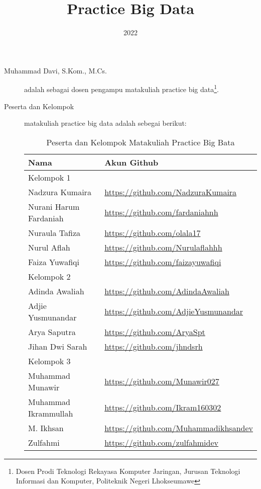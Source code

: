 \documentclass[a4paper]{tufte-handout}
\title{Practice Big Data}
\date{2022}
\begin{document}
\maketitle


\begin{projects}
	\begin{description}
		\item [Muhammad Davi, S.Kom., M.Cs.] adalah sebagai dosen pengampu matakuliah practice big data\footnote{Dosen Prodi Teknologi Rekayasa Komputer Jaringan, Jurusan Teknologi Informasi dan Komputer, Politeknik Negeri Lhokseumawe}.
		\item [Peserta dan Kelompok] matakuliah practice big data adalah sebegai berikut:

\begin{table}[!ht]
\caption{Peserta dan Kelompok Matakuliah Practice Big Bata}
\label{tab:peserta}
\centering
\begin{tabular}{ll} 
\toprule
Nama &	Akun Github\\
\midrule
Kelompok 1\\
\midrule
Nadzura Kumaira			& \url{https://github.com/NadzuraKumaira} \\
Nurani Harum Fardaniah	& \url{https://github.com/fardaniahnh} \\
Nuraula Tafiza			& \url{https://github.com/olala17} \\
Nurul Aflah				& \url{https://github.com/Nurulaflahhh} \\
Faiza Yuwafiqi			& \url{https://github.com/faizayuwafiqi} \\
\midrule
Kelompok 2\\
\midrule
Adinda Awaliah			& \url{https://github.com/AdindaAwaliah} \\
Adjie Yusmunandar		& \url{https://github.com/AdjieYusmunandar} \\
Arya Saputra			& \url{https://github.com/AryaSpt} \\
Jihan Dwi Sarah			& \url{https://github.com/jhndsrh} \\
\midrule
Kelompok 3\\
\midrule
Muhammad Munawir		& \url{https://github.com/Munawir027} \\
Muhammad Ikrammullah	& \url{https://github.com/Ikram160302} \\
M. Ikhsan				& \url{https://github.com/Muhammadikhsandev} \\
Zulfahmi				& \url{https://github.com/zulfahmidev} \\

\end{tabular}
\end{table}
\end{description}
\end{projects}
\end{document}

